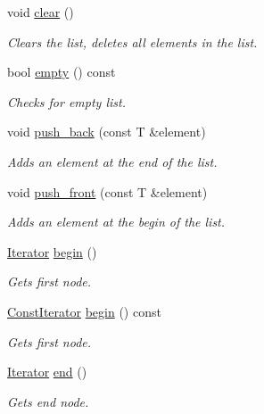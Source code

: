 \begin{DoxyCompactItemize}
void \hyperlink{classirr_1_1core_1_1list_aad18996ed41454bf7bb8e1d3199f4e73}{clear} ()
\begin{DoxyCompactList}\small\item\em Clears the list, deletes all elements in the list. \end{DoxyCompactList}\item 
bool \hyperlink{classirr_1_1core_1_1list_aa0958447b2269fff0d650cb464ba84bd}{empty} () const
\begin{DoxyCompactList}\small\item\em Checks for empty list. \end{DoxyCompactList}\item 
void \hyperlink{classirr_1_1core_1_1list_a0f73ebd87279766f339cb1462c2a24d1}{push\+\_\+back} (const T \&element)
\begin{DoxyCompactList}\small\item\em Adds an element at the end of the list. \end{DoxyCompactList}\item 
void \hyperlink{classirr_1_1core_1_1list_aec58963596cbc0435e706d1d00777b61}{push\+\_\+front} (const T \&element)
\begin{DoxyCompactList}\small\item\em Adds an element at the begin of the list. \end{DoxyCompactList}\item 
\hyperlink{classirr_1_1core_1_1list_1_1Iterator}{Iterator} \hyperlink{classirr_1_1core_1_1list_aebd05a0f5e5ead6e1d5b6e3973da8039}{begin} ()
\begin{DoxyCompactList}\small\item\em Gets first node. \end{DoxyCompactList}\item 
\hyperlink{classirr_1_1core_1_1list_1_1ConstIterator}{Const\+Iterator} \hyperlink{classirr_1_1core_1_1list_a9f7cba97077273eaaac4691c49cc35c1}{begin} () const
\begin{DoxyCompactList}\small\item\em Gets first node. \end{DoxyCompactList}\item 
\hyperlink{classirr_1_1core_1_1list_1_1Iterator}{Iterator} \hyperlink{classirr_1_1core_1_1list_aa80509dac5224fa57cc548e39480a115}{end} ()
\begin{DoxyCompactList}\small\item\em Gets end node. \end{DoxyCompactList}\item 

\end{DoxyCompactItemize}
